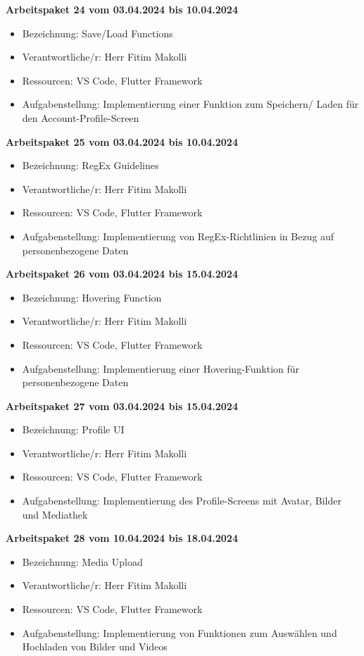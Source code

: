\textbf{Arbeitspaket 24 vom 03.04.2024 bis 10.04.2024}
\begin{itemize}[itemsep=0pt]
    \item{Bezeichnung: Save/Load Functions} 
	\item{Verantwortliche/r: Herr Fitim Makolli} 
	\item{Ressourcen: VS Code, Flutter Framework} 
    \item{Aufgabenstellung: Implementierung einer Funktion zum Speichern/ Laden für den Account-Profile-Screen}
\end{itemize}

\textbf{Arbeitspaket 25 vom 03.04.2024 bis 10.04.2024}
\begin{itemize}[itemsep=0pt]
    \item{Bezeichnung: RegEx Guidelines} 
	\item{Verantwortliche/r: Herr Fitim Makolli} 
	\item{Ressourcen: VS Code, Flutter Framework}
    \item{Aufgabenstellung: Implementierung von RegEx-Richtlinien in Bezug auf personenbezogene Daten}
\end{itemize} 

\newpage
\textbf{Arbeitspaket 26 vom 03.04.2024 bis 15.04.2024}
\begin{itemize}[itemsep=0pt]
    \item{Bezeichnung: Hovering Function} 
	\item{Verantwortliche/r: Herr Fitim Makolli} 
	\item{Ressourcen: VS Code, Flutter Framework}
    \item{Aufgabenstellung: Implementierung einer Hovering-Funktion für personenbezogene Daten} 
\end{itemize}

\textbf{Arbeitspaket 27 vom 03.04.2024 bis 15.04.2024}
\begin{itemize}[itemsep=0pt]
    \item{Bezeichnung: Profile UI} 
	\item{Verantwortliche/r: Herr Fitim Makolli} 
	\item{Ressourcen: VS Code, Flutter Framework} 
    \item{Aufgabenstellung: Implementierung des Profile-Screens mit Avatar, Bilder und Mediathek}
\end{itemize}

\textbf{Arbeitspaket 28 vom 10.04.2024 bis 18.04.2024}
\begin{itemize}[itemsep=0pt]
    \item{Bezeichnung: Media Upload} 
	\item{Verantwortliche/r: Herr Fitim Makolli} 
	\item{Ressourcen: VS Code, Flutter Framework} 
    \item{Aufgabenstellung: Implementierung von Funktionen zum Auswählen und Hochladen von Bilder und Videos}
\end{itemize} 

